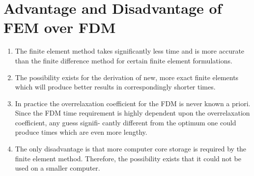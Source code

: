 \documentclass[a4paper,12pt]{article}
\begin{document}
\section{Advantage and Disadvantage of FEM over FDM}
\begin{enumerate}
	\item The finite element method takes significantly less time and is more accurate than the finite difference method for certain finite element formulations.
	\item  The possibility exists for the derivation of new, more exact finite elements which will produce better results in correspondingly shorter times.
	\item In practice the overrelaxation coefficient for the FDM is never known a priori. Since the FDM time requirement is highly dependent upon the overrelaxation coefficient, any guess signifi- cantly different from the optimum one could produce times which are even more lengthy.
	\item The only disadvantage is that more computer core storage is required by the finite element method. Therefore, the possibility exists that it could not be used on a smaller computer.
\end{enumerate}
\end{document}
